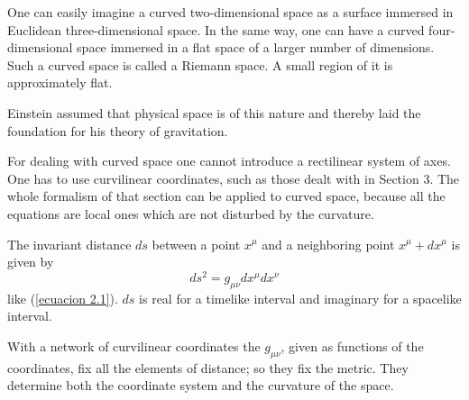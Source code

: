 One can easily imagine a curved two-dimensional space as a surface immersed in Euclidean three-dimensional space. In the same way, one can have a curved four-dimensional space immersed in a flat space of a larger number of dimensions. Such a curved space is called a Riemann space. A small region of it is approximately flat.

Einstein assumed that physical space is of this nature and thereby laid the foundation for his theory of gravitation.

For dealing with curved space one cannot introduce a rectilinear system of axes. One has to use curvilinear coordinates, such as those dealt with in Section 3. The whole formalism of that section can be applied to curved space, because all the equations are local ones which are not disturbed by the curvature.

The invariant distance $ds$ between a point $x^\mu$ and a neighboring point $x^\mu + dx^\mu$ is given by 
\[
 ds^2 = g_{\mu\nu}dx^\mu dx^\nu
\]
like (\ref{ecuacion 2.1}). $ds$ is real for a timelike interval and imaginary for a spacelike interval.

With a network of curvilinear coordinates the $g_{\mu\nu}$, given as functions of the coordinates, fix all the elements of distance; so they fix the metric. They determine both the coordinate system and the curvature of the space.